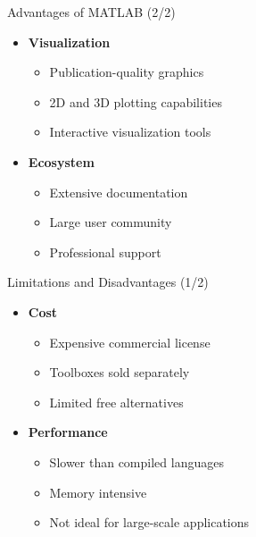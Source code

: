 \documentclass[10pt]{beamer}
\theoremstyle{plain}%
\theoremstyle{definition}
\theoremstyle{remark}
\begin{document}
\begin{frame}{Advantages of MATLAB (2/2)}
\begin{itemize}
    \item \textbf{Visualization}
        \begin{itemize}
            \item Publication-quality graphics
            \item 2D and 3D plotting capabilities
            \item Interactive visualization tools
        \end{itemize}
    \item \textbf{Ecosystem}
        \begin{itemize}
            \item Extensive documentation
            \item Large user community
            \item Professional support
        \end{itemize}
\end{itemize}
\end{frame}

\begin{frame}{Limitations and Disadvantages (1/2)}
\begin{itemize}
    \item \textbf{Cost}
        \begin{itemize}
            \item Expensive commercial license
            \item Toolboxes sold separately
            \item Limited free alternatives
        \end{itemize}
    \item \textbf{Performance}
        \begin{itemize}
            \item Slower than compiled languages
            \item Memory intensive
            \item Not ideal for large-scale applications
        \end{itemize}
\end{itemize}
\end{frame}
\end{document}
